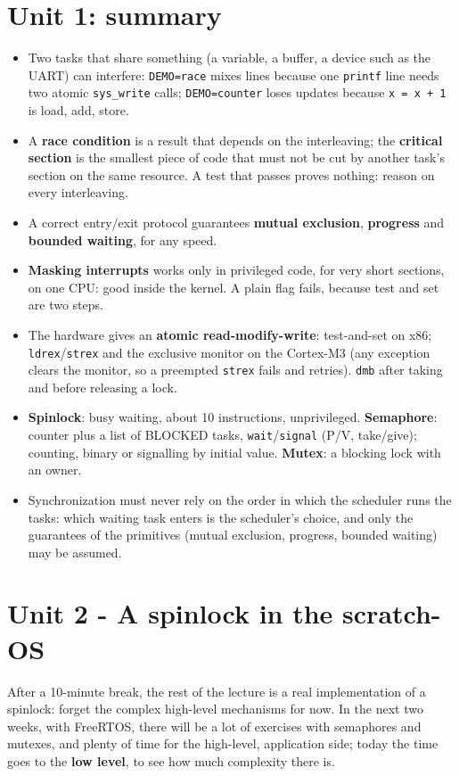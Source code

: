 \section{Unit 1: summary}
\begin{itemize}
    \item Two tasks that share something (a variable, a buffer, a device such as the UART) can interfere: \texttt{DEMO=race} mixes lines because one \texttt{printf} line needs two atomic \texttt{sys\_write} calls; \texttt{DEMO=counter} loses updates because \texttt{x = x + 1} is load, add, store.
    \item A \textbf{race condition} is a result that depends on the interleaving; the \textbf{critical section} is the smallest piece of code that must not be cut by another task's section on the same resource. A test that passes proves nothing: reason on every interleaving.
    \item A correct entry/exit protocol guarantees \textbf{mutual exclusion}, \textbf{progress} and \textbf{bounded waiting}, for any speed.
    \item \textbf{Masking interrupts} works only in privileged code, for very short sections, on one CPU: good inside the kernel. A plain flag fails, because test and set are two steps.
    \item The hardware gives an \textbf{atomic read-modify-write}: test-and-set on x86; \texttt{ldrex}/\texttt{strex} and the exclusive monitor on the Cortex-M3 (any exception clears the monitor, so a preempted \texttt{strex} fails and retries). \texttt{dmb} after taking and before releasing a lock.
    \item \textbf{Spinlock}: busy waiting, about 10 instructions, unprivileged. \textbf{Semaphore}: counter plus a list of BLOCKED tasks, \texttt{wait}/\texttt{signal} (P/V, take/give); counting, binary or signalling by initial value. \textbf{Mutex}: a blocking lock with an owner.
    \item Synchronization must never rely on the order in which the scheduler runs the tasks: which waiting task enters is the scheduler's choice, and only the guarantees of the primitives (mutual exclusion, progress, bounded waiting) may be assumed.
\end{itemize}

\section{Unit 2 - A spinlock in the scratch-OS}
After a 10-minute break, the rest of the lecture is a real implementation of a spinlock: forget the complex high-level mechanisms for now. In the next two weeks, with FreeRTOS, there will be a lot of exercises with semaphores and mutexes, and plenty of time for the high-level, application side; today the time goes to the \textbf{low level}, to see how much complexity there is.

